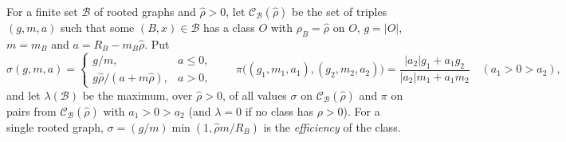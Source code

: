 \documentclass[11pt,a4paper]{report}
\newcommand*{\cB}{\mathcal{B}}
\newcommand*{\cC}{\mathcal{C}}
\begin{document}
For a finite set \(\cB\) of rooted graphs and \(\hat\rho>0\), let \(\cC_{\cB}(\hat\rho)\) be the set of triples
\((g,m,a)\) such that some \((B,x)\in\cB\) has a class \(O\) with \(\rho_B=\hat\rho\) on \(O\), \(g=|O|\), \(m=m_B\) and
\(a=R_B-m_B\hat\rho\). Put
\[\sigma(g,m,a)=\begin{cases}g/m,&a\le0,\\ g\hat\rho/(a+m\hat\rho),&a>0,\end{cases}\qquad
\pi\bigl((g_1,m_1,a_1),(g_2,m_2,a_2)\bigr)=\frac{|a_2|g_1+a_1g_2}{|a_2|m_1+a_1m_2}\quad(a_1>0>a_2),\]
and let \(\lambda(\cB)\) be the maximum, over \(\hat\rho>0\), of all values \(\sigma\) on \(\cC_{\cB}(\hat\rho)\) and
\(\pi\) on pairs from \(\cC_{\cB}(\hat\rho)\) with \(a_1>0>a_2\) (and \(\lambda=0\) if no class has \(\rho>0\)). For a
single rooted graph, \(\sigma=(g/m)\min(1,\hat\rho m/R_B)\) is the \emph{efficiency} of the class.
\end{document}
